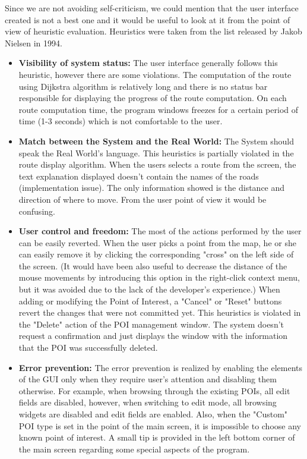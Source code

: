 \documentclass{article}
\begin{document}
Since we are not avoiding self-criticism, we could mention that the user interface created is not a best one and it would be useful to look at it from the point of view of heuristic evaluation. Heuristics were taken from the list released by Jakob Nielsen in 1994.

\begin{itemize}

	\item \textbf{Visibility of system status: }
	The user interface generally follows this heuristic, however there are some violations. The computation of the route using Dijkstra algorithm is relatively long and there is no status bar responsible for displaying the progress of the route computation. On each route computation time, the program windows freezes for a certain period of time (1-3 seconds) which is not comfortable to the user.
	
	\item \textbf{Match between the System and the Real World: }
	The System should speak the Real World's language. This heuristics is partially violated in the route display algorithm. When the users selects a route from the screen, the text explanation displayed doesn't contain the names of the roads  (implementation issue). The only information showed is the distance and direction of where to move. From the user point of view it would be confusing.
	
	\item \textbf{User control and freedom: } 
	The most of the actions performed by the user can be easily reverted. When the user picks a point from the map, he or she can easily remove it by clicking the corresponding "cross" on the left side of the screen. (It would have been also useful to decrease the distance of the mouse movements by introducing this option in the right-click context menu, but it was avoided due to the lack of the developer's experience.)
	When adding or modifying the Point of Interest, a "Cancel" or "Reset" buttons revert the changes that were not committed yet.
	This heuristics is violated in the "Delete" action of the POI management window. The system doesn't request a confirmation and just displays the window with the information that the POI was successfully deleted.
	
	\item \textbf{Error prevention: }
	The error prevention is realized by enabling the elements of the GUI only when they require user's attention and disabling them otherwise. For example, when browsing through the existing POIs, all edit fields are disabled, however, when switching to edit mode, all browsing widgets are disabled and edit fields are enabled. Also, when the "Custom" POI type is set in the point of the main screen, it is impossible to choose any known point of interest.
	A small tip is provided in the left bottom corner of the main screen regarding some special aspects of the program.
	

\end{itemize}
\end{document}
